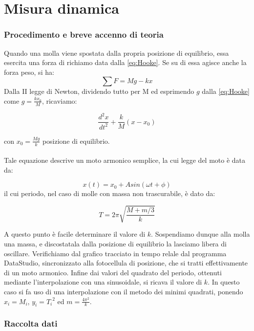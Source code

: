 
\section{Misura dinamica}

\subsubsection{Procedimento e breve accenno di teoria}

Quando una molla viene spostata dalla propria posizione di equilibrio, essa esercita una forza di richiamo data dalla \ref{eq:Hooke}. Se su di essa agisce anche la forza peso, si ha:
$$\displaystyle\sum{F}=Mg-kx$$
Dalla II legge di Newton, dividendo tutto per M ed esprimendo $g$ dalla \ref{eq:Hooke} come $g=\displaystyle{\frac{kx_0}{M}}$, ricaviamo:

\begin{equation}
\frac{d^2x}{dt^2}+\frac{k}{M}(x-x_0)
\end{equation}

con $x_0=\displaystyle{\frac{Mg}{k}}$ posizione di equilibrio.\\
\\
Tale equazione descrive un moto armonico semplice, la cui legge del moto è data da:

\begin{equation}\label{eqmoto}
x(t)=x_0+Asin(\omega t+\phi)
\end{equation} 
il cui periodo, nel caso di molle con massa non trascurabile, è dato da:

\begin{equation}\label{periodo}
T=2\pi\sqrt{\frac{M+m/3}{k}}
\end{equation}  

A questo punto è facile determinare il valore di $k$. Sospendiamo dunque alla molla una massa, e discostatala dalla posizione di equilibrio la lasciamo libera di oscillare. Verifichiamo dal grafico tracciato in tempo relale dal programma DataStudio, sincronizzato alla fotocellula di posizione, che si tratti effettivamente di un moto armonico. Infine dai valori del quadrato del periodo, ottenuti mediante l'interpolazione con una sinusoidale, si ricava il valore di $k$. In questo caso si fa uso di una interpolazione con il metodo dei minimi quadrati, ponendo $x_i=M_i$, $y_i={T_i}^2$ ed $m=\displaystyle{\frac{4\pi^2}{k}}$. 

\subsubsection{Raccolta dati}

